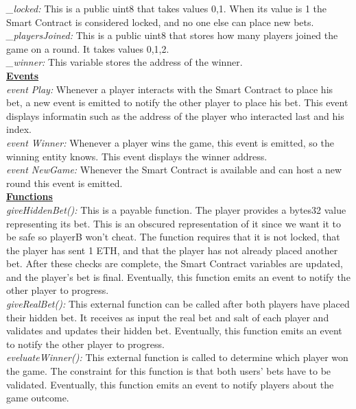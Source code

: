 \documentclass[12pt,a4paper]{article}
\begin{document}
\emph{\_locked:} This is a public uint8 that takes values 0,1. When its value
is 1 the Smart Contract is considered locked, and no one else can place new bets.\\

\emph{\_playersJoined:} This is a public uint8 that stores how many players joined the game on a round. It takes
values 0,1,2.\\

\emph{\_winner:} This variable stores the address of the winner.\\


\textbf{\underline{Events}} \\

\emph{event Play:} Whenever a player interacts with the Smart Contract to place his bet, a new event is emitted
to notify the other player to place his bet. This event displays informatin such as the address of the player
who interacted last and his index.\\

\emph{event Winner:} Whenever a player wins the game, this event is emitted, so the winning entity knows. This event displays the winner address.\\

\emph{event NewGame:} Whenever the Smart Contract is available and can host a new round this event is emitted.\\


\textbf{\underline{Functions}} \\

\emph{giveHiddenBet():} This is a payable function. The player provides a bytes32 value representing its bet.
This is an obscured representation of it since we want it to be safe so playerB won't cheat.
The function requires that it is not locked, that the player has sent 1 ETH, and that the player
has not already placed another bet. After these checks are complete, the Smart Contract variables
are updated, and the player's bet is final. Eventually, this function emits an event to notify the other player to progress.\\

\emph{giveRealBet():} This external function can be called after both players have placed their hidden bet.
It receives as input the real bet and salt of each player and validates and updates their hidden bet.
Eventually, this function emits an event to notify the other player to progress.\\

\emph{eveluateWinner():} This external function is called to determine which player won the game.
The constraint for this function is that both users' bets have to be validated.
Eventually, this function emits an event to notify players about the game outcome.\\
\end{document}
